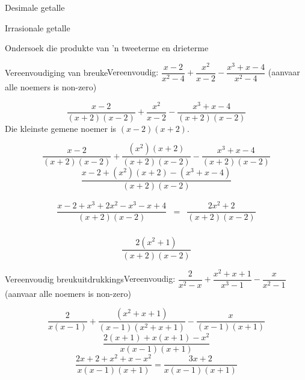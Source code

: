\begin{Aktiwiteit}{Desimale getalle}
\begin{aktiwiteit}{Irrasionale getalle}
\begin{aktiwiteit}{Ondersoek die produkte van 'n tweeterme en drieterme}
%      
\begin{wex}{Vereenvoudiging van breuke}{Vereenvoudig: $\dfrac{x-2}{{x}^{2}-4}+\dfrac{{x}^{2}}{x-2}-\dfrac{{x}^{3}+x-4}{{x}^{2}-4}$ 
(aanvaar alle noemers is non-zero)}
{
\begin{equation*}
\frac{x-2}{(x+2)(x-2)}+\frac{{x}^{2}}{x-2}-\frac{{x}^{3}+x-4}{(x+2)(x-2)}
\end{equation*}
 Die kleinste gemene noemer is $(x-2)(x+2)$.\par 

\begin{equation*}
\frac{x-2}{(x+2)(x-2)}+\frac{({x}^{2})
(x+2)}{(x+2)(x-2)}-\frac{{x}^{3}+x-4}{(x+2)(x-2)}
\end{equation*}
\begin{equation*}
\frac{x-2+({x}^{2})(x+2)-(x^{3}+x-4)}{(x+2)(x-2)}
\end{equation*}

\begin{equation*}
 \begin{array}{llll}
\dfrac{x-2+{x}^{3}+ 2x^{2}-x^{3} - x+4}{(x+2)(x-2)} & = & \dfrac{2x^{2} + 2}{(x+2)(x-2)}\\
\end{array}
\end{equation*}

\begin{equation*}
\dfrac{2({x}^{2}
+1)}{(x+2)(x-2)}
\end{equation*}
}
\end{wex}

\begin{wex}{Vereenvoudig breukuitdrukkings}{Vereenvoudig: $\dfrac{2}{{x}^{2}-x}+\dfrac{x^{2}+x+1}{x^{3}-1}-\dfrac{x}{{x}^{2}-1}$ 
(aanvaar alle noemers is non-zero)}
{
\begin{equation*}
\dfrac{2}{x(x-1)}+ \dfrac{({x}^{2} + x + 1)}{(x-1)(x^{2}+x+1)}-\dfrac{x}{(x-1)(x+1)}
\end{equation*}
\begin{equation*}
\dfrac{2(x+1)+x(x+1)-x^{2}}{x(x-1)(x+1)}
\end{equation*}
\begin{equation*}
\dfrac{2x+2 + x^{2} + x - x^{2}}{x(x-1)(x+1)} = \dfrac{3x+2}{x(x-1)(x+1)}
\end{equation*}



}
\end{wex}
\end{aktiwiteit}
\end{aktiwiteit}
\end{Aktiwiteit}
